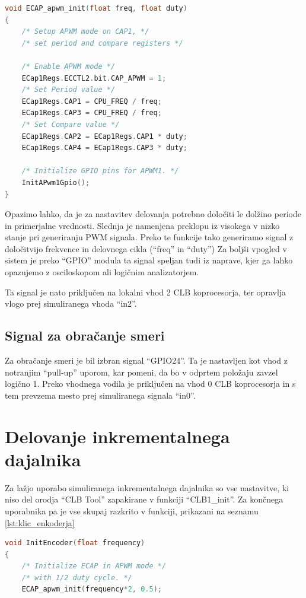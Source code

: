 \documentclass[a4paper]{article}
\begin{document}
\begin{sloppypar}
\begin{lstlisting}[language=C,
                   caption={Implementacija funkcije za usposobitev ``eCAP'' 
                            modula v ``apwm'' načinu},
                   label={lst:ecap_init}]
void ECAP_apwm_init(float freq, float duty)
{
    /* Setup APWM mode on CAP1, */
    /* set period and compare registers */

    /* Enable APWM mode */
    ECap1Regs.ECCTL2.bit.CAP_APWM = 1;
    /* Set Period value */
    ECap1Regs.CAP1 = CPU_FREQ / freq;
    ECap1Regs.CAP3 = CPU_FREQ / freq;
    /* Set Compare value */
    ECap1Regs.CAP2 = ECap1Regs.CAP1 * duty;
    ECap1Regs.CAP4 = ECap1Regs.CAP3 * duty;

    /* Initialize GPIO pins for APWM1. */
    InitAPwm1Gpio();
}
\end{lstlisting}

Opazimo lahko, da je za nastavitev delovanja potrebno določiti le dolžino
periode in primerjalne vrednosti. Slednja je namenjena preklopu iz visokega v
nizko stanje pri generiranju PWM signala. Preko te funkcije tako generiramo
signal z določitvijo frekvence in delovnega cikla (``freq'' in ``duty'') Za
boljši vpogled v sistem je preko ``GPIO'' modula ta signal speljan tudi iz
naprave, kjer ga lahko opazujemo z osciloskopom ali logičnim analizatorjem.

Ta signal je nato priključen na lokalni vhod 2 CLB koprocesorja, ter opravlja
vlogo prej simuliranega vhoda ``in2''.

\subsection{Signal za obračanje smeri}
Za obračanje smeri je bil izbran signal ``GPIO24''. Ta je nastavljen kot vhod z
notranjim ``pull-up'' uporom, kar pomeni, da bo v odprtem položaju zavzel
logično 1. Preko vhodnega vodila je priključen na vhod 0 CLB koprocesorja in s
tem prevzema mesto prej simuliranega signala ``in0''.


\section{Delovanje inkrementalnega dajalnika}
Za lažjo uporabo simuliranega inkrementalnega dajalnika so vse nastavitve, ki
niso del orodja ``CLB Tool'' zapakirane v funkciji ``CLB1\_init''. Za končnega
uporabnika pa je vse skupaj razkrito v funkciji, prikazani na seznamu
\ref{lst:klic_enkoderja}

\filbreak
\begin{lstlisting}[language=C,
                   caption={Implementacija funkcije za nastavitev 
                            inkrementalnega dajalnika},
                   label={lst:klic_enkoderja}]
void InitEncoder(float frequency)
{
    /* Initialize ECAP in APWM mode */
    /* with 1/2 duty cycle. */
    ECAP_apwm_init(frequency*2, 0.5);


\end{lstlisting}
\end{sloppypar}
\end{document}
